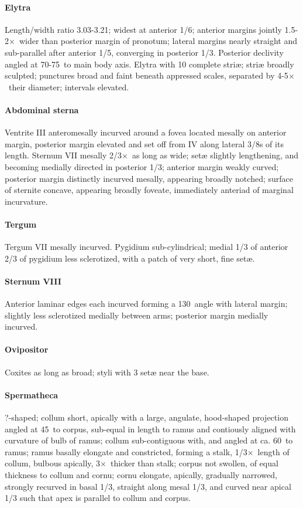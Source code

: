 \documentclass[fleqn,10pt,lineno]{wlpeerj} %
\newcommand{\td}{\textdegree~}
\newcommand{\x}{$\times$~}
\begin{document}
			\paragraph{Elytra}
				Length/width ratio 3.03-3.21; widest at anterior 1/6; anterior margins jointly 1.5-2\x wider than posterior margin of pronotum; lateral margins nearly straight and sub-parallel after anterior 1/5, converging in posterior 1/3. 
				Posterior declivity angled at 70-75\td to main body axis. Elytra with 10 complete stri{\ae}; stri{\ae} broadly sculpted; punctures broad and faint beneath appressed scales, separated by 4-5\x their diameter; intervals elevated.
			\paragraph{Abdominal sterna}
				Ventrite III anteromesally incurved around a fovea located mesally on anterior margin, posterior margin elevated and set off from IV along lateral 3/8s of its length. 
				Sternum VII mesally 2/3\x as long as wide; set{\ae} slightly lengthening, and becoming medially directed in posterior 1/3; anterior margin weakly curved; posterior margin distinctly incurved mesally, appearing broadly notched; surface of sternite concave, appearing broadly foveate, immediately anteriad of marginal incurvature.
			\paragraph{Tergum}
				Tergum VII mesally incurved.
				Pygidium sub-cylindrical; medial 1/3 of anterior 2/3 of pygidium less sclerotized, with a patch of very short, fine set{\ae}.
			\paragraph{Sternum VIII}
				Anterior laminar edges each incurved forming a 130\td angle with lateral margin; slightly less sclerotized medially between arms; posterior margin medially incurved.
			\paragraph{Ovipositor}
				Coxites as long as broad; styli with 3 set{\ae} near the base.
			\paragraph{Spermatheca}
				?-shaped; collum short, apically with a large, angulate, hood-shaped projection angled at 45\td to corpus, sub-equal in length to ramus and contiously aligned with curvature of bulb of ramus; collum sub-contiguous with, and angled at ca. 60\td to ramus; ramus basally elongate and constricted, forming a stalk, 1/3\x length of collum, bulbous apically, 3\x thicker than stalk; corpus not swollen, of equal thickness to collum and cornu; cornu elongate, apically, gradually narrowed, strongly recurved in basal 1/3, straight along mesal 1/3, and curved near apical 1/3 such that apex is parallel to collum and corpus.
\end{document}
